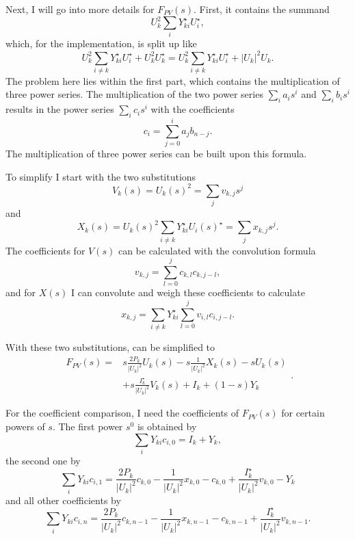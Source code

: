 Next, I will go into more details for $F_{PV}(s)$. First, it contains the summand 
\begin{equation}
	U_k^2 \sum_i Y_{ki}^\star U_i^\star,
\end{equation}
which, for the implementation, is split up like
\begin{equation}
	U_k^2 \sum_{i \ne k} Y_{ki}^\star U_i^\star + U_k^2 U_k^\star = U_k^2 \sum_{i \ne k} Y_{ki}^\star U_i^\star + |U_k|^2 U_k.
\end{equation}
The problem here lies within the first part, which contains the multiplication of three power series. The multiplication of the two power series $\sum_i a_i s^i$ and $\sum_i b_i s^i$ results in the power series $\sum_i c_i s^i$ with the coefficients
\begin{equation}
	c_i = \sum_{j = 0}^i a_j b_{n - j}.
\end{equation}
The multiplication of three power series can be built upon this formula.

To simplify  I start with the two substitutions
\begin{equation}
	V_k(s) = U_k(s)^2 = \sum_j v_{k,j} s^j
\end{equation}
and
\begin{equation}
	X_k(s) = U_k(s)^2 \sum_{i \ne k} Y_{ki}^\star U_i(s)^\star = \sum_j x_{k,j} s^j.
\end{equation}
The coefficients for $V(s)$ can be calculated with the convolution formula
\begin{equation}
	v_{k,j} = \sum_{l = 0}^j c_{k,l} c_{k,j - l},
\end{equation}
and for $X(s)$ I can convolute and weigh these coefficients to calculate
\begin{equation}
	x_{k,j} = \sum_{i \ne k} Y_{ki}^\star \sum_{l = 0}^j v_{i,l} c_{i,j - l}.
\end{equation}

With these two substitutions,  can be simplified to
\begin{equation}
	\begin{split}
		F_{PV}(s) = 
			& s \frac{2 P_k}{|U_k|^2} U_k(s) - s \frac{1}{|U_k|^2} X_k(s) - s U_k(s) \\
			& + s \frac{I_k^\star}{|U_k|^2} V_k(s) + I_k + (1 - s) Y_k
	\end{split}.
\end{equation}

For the coefficient comparison, I need the coefficients of $F_{PV}(s)$ for certain powers of $s$. The first power $s^0$ is obtained by
\begin{equation}
	\sum_i Y_{ki} c_{i,0} = I_k + Y_k,
\end{equation}
the second one by
\begin{equation}
	\sum_i Y_{ki} c_{i,1} = \frac{2 P_k}{|U_k|^2} c_{k,0} - \frac{1}{|U_k|^2} x_{k,0} - c_{k,0} + \frac{I_k^\star}{|U_k|^2} v_{k,0} - Y_k
\end{equation}
and all other coefficients by
\begin{equation}
	\sum_i Y_{ki} c_{i,n} = \frac{2 P_k}{|U_k|^2} c_{k,n-1} - \frac{1}{|U_k|^2} x_{k,n-1} - c_{k,n-1} + \frac{I_k^\star}{|U_k|^2} v_{k,n-1}.
\end{equation}

